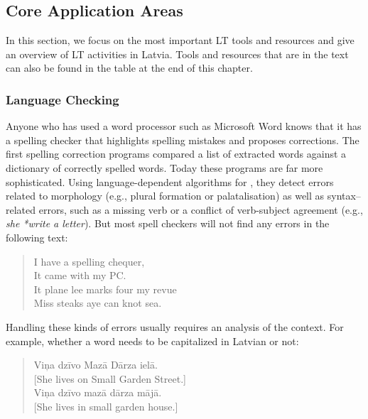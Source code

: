 \begin{multicols}{2}
\subsection{Core Application Areas}

In this section, we focus on the most important LT tools and resources and give an overview of LT activities in Latvia.
Tools and resources that are  in the text can also be found in the table at the end of this chapter.

\subsubsection{Language Checking}

Anyone who has used a word processor such as Microsoft Word knows that it has a spelling checker that highlights spelling mistakes and proposes corrections.
The first spelling correction programs compared a list of extracted words against a dictionary of correctly spelled words.
Today these programs are far more sophisticated.
Using language-dependent algorithms for , they detect errors related to morphology (e.g., plural formation or palatalisation) as well as syntax--related errors, such as a missing verb or a conflict of verb-subject agreement (e.g., \textit{she *write a letter}).
But most spell checkers will not find any errors in the following text:  

\begin{quote}
  I have a spelling chequer,\\
  It came with my PC.\\
  It plane lee marks four my revue\\
  Miss steaks aye can knot sea. \cite{Meta15}
\end{quote}



Handling these kinds of errors usually requires an analysis of the context.
For example, whether a word needs to be capitalized in Latvian or not:
\begin{quote}
Viņa dzīvo Mazā Dārza ielā.\\
{[}She lives on Small Garden Street.{]}\\
Viņa dzīvo mazā dārza mājā.\\
{[}She lives in small garden house.{]}
\end{quote}


\end{multicols}
